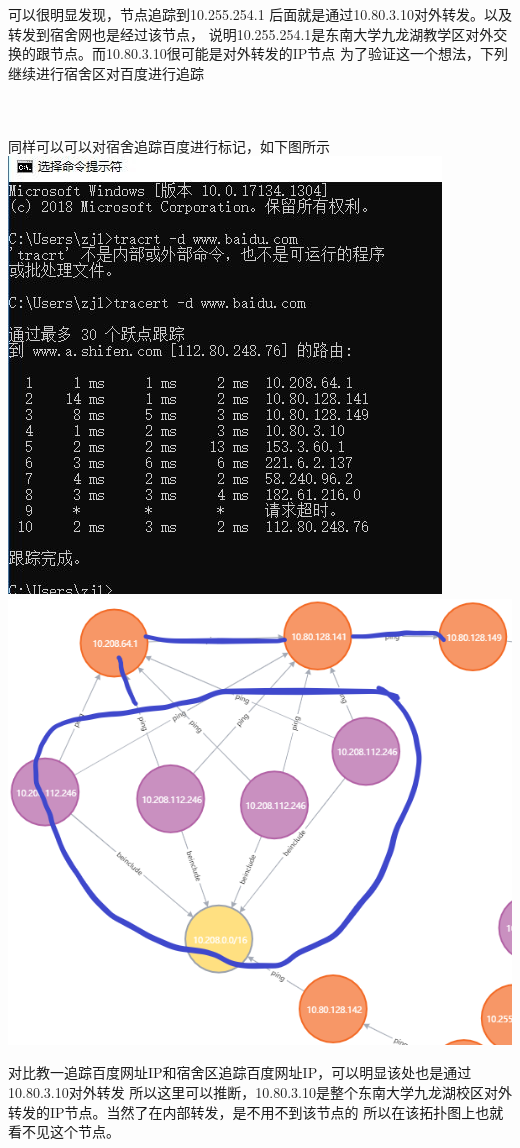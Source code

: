 \documentclass{article} %
\begin{document}
    \par 可以很明显发现，节点追踪到10.255.254.1 后面就是通过10.80.3.10对外转发。以及转发到宿舍网也是经过该节点，
    说明10.255.254.1是东南大学九龙湖教学区对外交换的跟节点。而10.80.3.10很可能是对外转发的IP节点
    为了验证这一个想法，下列继续进行宿舍区对百度进行追踪
    \\
    \\
    \\
    \par 同样可以可以对宿舍追踪百度进行标记，如下图所示\\
    \includegraphics[scale=0.5]{pic/追踪百度.JPG} \includegraphics[scale=0.7]{pic/宿舍东南大学网络拓扑图.png}
    \par 对比教一追踪百度网址IP和宿舍区追踪百度网址IP，可以明显该处也是通过10.80.3.10对外转发
    所以这里可以推断，10.80.3.10是整个东南大学九龙湖校区对外转发的IP节点。当然了在内部转发，是不用不到该节点的
    所以在该拓扑图上也就看不见这个节点。
\end{document}
